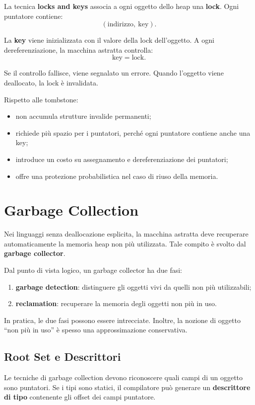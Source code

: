 \documentclass{article}
\begin{document}
La tecnica \textbf{locks and keys} associa a ogni oggetto dello heap una \textbf{lock}. Ogni puntatore contiene:
\[
(\text{indirizzo},\ \text{key}).
\]

La \textbf{key} viene inizializzata con il valore della lock dell'oggetto. A ogni dereferenziazione, la macchina astratta controlla:
\[
\text{key} = \text{lock}.
\]

Se il controllo fallisce, viene segnalato un errore. Quando l'oggetto viene deallocato, la lock è invalidata.

Rispetto alle tombstone:
\begin{itemize}
  \item non accumula strutture invalide permanenti;
  \item richiede più spazio per i puntatori, perché ogni puntatore contiene anche una key;
  \item introduce un costo su assegnamento e dereferenziazione dei puntatori;
  \item offre una protezione probabilistica nel caso di riuso della memoria.
\end{itemize}

\section{Garbage Collection}

Nei linguaggi senza deallocazione esplicita, la macchina astratta deve recuperare automaticamente la memoria heap non più utilizzata. Tale compito è svolto dal \textbf{garbage collector}.

Dal punto di vista logico, un garbage collector ha due fasi:
\begin{enumerate}
  \item \textbf{garbage detection}: distinguere gli oggetti vivi da quelli non più utilizzabili;
  \item \textbf{reclamation}: recuperare la memoria degli oggetti non più in uso.
\end{enumerate}

In pratica, le due fasi possono essere intrecciate. Inoltre, la nozione di oggetto ``non più in uso'' è spesso una approssimazione conservativa.

\subsection{Root Set e Descrittori}

Le tecniche di garbage collection devono riconoscere quali campi di un oggetto sono puntatori. Se i tipi sono statici, il compilatore può generare un \textbf{descrittore di tipo} contenente gli offset dei campi puntatore.
\end{document}
